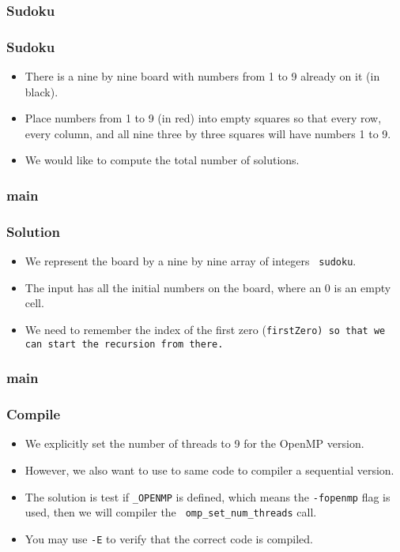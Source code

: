 \documentclass{beamer}
\begin{document}

\begin{frame}
\frametitle{Sudoku}
\centerline{}
\end{frame}

\begin{frame}
\frametitle{Sudoku}
\begin{itemize}
\item There is a nine by nine board with numbers from 1 to 9 already on it (in black).
\item Place numbers from 1 to 9 (in red) into empty squares so that
  every row, every column, and all nine three by three squares will have
  numbers 1 to 9.
\item We would like to compute the total number of solutions.
\end{itemize}

\end{frame}


\begin{frame}
\frametitle{main} 
\end{frame}

\begin{frame}
\frametitle{Solution}
\begin{itemize}
\item We represent the board by a nine by nine array of integers {\tt
  sudoku}.
\item The input has all the initial numbers on the board, where an 0 is an empty cell.
\item We need to remember the index of the first zero (\tt firstZero)
  so that we can start the recursion from there.
\end{itemize}
\end{frame}


\begin{frame}
\frametitle{main} 
\end{frame}

\begin{frame}
\frametitle{Compile}
\begin{itemize}
\item We explicitly set the number of threads to 9 for the OpenMP
  version.  
\item However, we also want to use to same code to compiler a
  sequential version. 
\item The solution is test if {\tt \_OPENMP} is defined, which means
  the {\tt -fopenmp} flag is used, then we will compiler the {\tt
    omp\_set\_num\_threads} call.
\item You may use {\tt -E} to verify that the correct code is
  compiled.
\end{itemize}
\end{frame}
\end{document}
